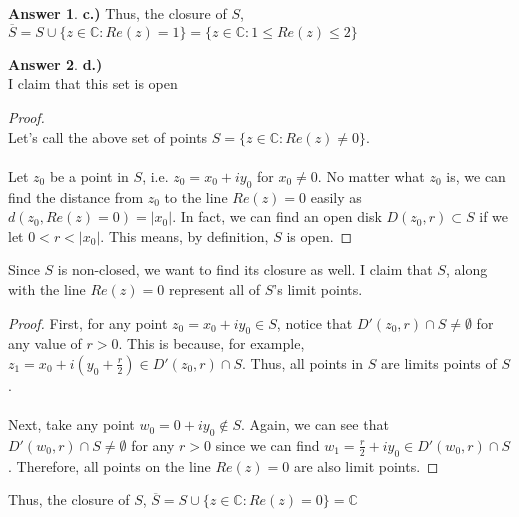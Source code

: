 \documentclass[10pt,a4paper]{article}
\theoremstyle{definition}
\newtheorem*{answer*}{Answer}
\begin{document}
\begin{answer*}{\textbf{c.)}}
Thus, the closure of $S$, $\overline{S} = S \cup \{z \in \mathbb{C} : Re(z) = 1\} = \{z \in \mathbb{C} : 1 \leq Re(z) \leq 2\}$
\end{answer*}

\begin{answer*}{\textbf{d.)}}
\\I claim that this set is open
\begin{proof}{$ $}
\\Let's call the above set of points $S = \{z \in \mathbb{C} : Re(z) \neq 0\}$.
\\
\\Let $z_0$ be a point in $S$, i.e. $z_0 = x_0 + iy_0$ for $x_0 \neq 0$. No matter what $z_0$ is, we can find the distance from $z_0$ to the line $Re(z) = 0$ easily as $d(z_0, Re(z) = 0) = |x_0|$. In fact, we can find an open disk $D(z_0, r) \subset S$ if we let $0< r < |x_0|$. This means, by definition, $S$ is open. 
\end{proof}

Since $S$ is non-closed, we want to find its closure as well. I claim that $S$, along with the line $Re(z) = 0$ represent all of $S$'s limit points. 

\begin{proof}
First, for any point $z_0 = x_0 + iy_0 \in S$, notice that $D'(z_0, r) \cap S \neq \emptyset$ for any value of $r>0$. This is because, for example, $z_1 = x_0 + i(y_0 + \frac{r}{2}) \in D'(z_0, r) \cap S$. Thus, all points in $S$ are limits points of $S$.
\\
\\Next, take any point $w_0 = 0 + iy_0 \notin S$. Again, we can see that $D'(w_0, r) \cap S \neq \emptyset$ for any $r>0$ since we can find $w_1 = \frac{r}{2} + iy_0 \in D'(w_0, r) \cap S$. Therefore, all points on the line $Re(z) = 0$ are also limit points. 
\end{proof}

Thus, the closure of $S$, $\overline{S} = S \cup \{z \in \mathbb{C} : Re(z) = 0\} = \mathbb{C}$
\end{answer*}
\end{document}
